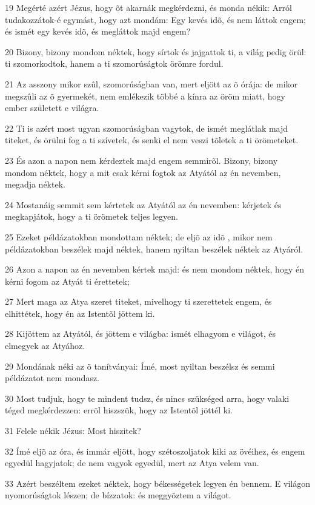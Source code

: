\par 19 Megérté azért Jézus, hogy õt akarnák megkérdezni, és monda nékik: Arról tudakozzátok-é egymást, hogy azt mondám: Egy kevés idõ, és nem láttok engem; és ismét egy kevés idõ, és megláttok majd engem?
\par 20 Bizony, bizony mondom néktek, hogy sírtok és jajgattok ti, a világ pedig örül: ti szomorkodtok, hanem a ti szomorúságtok örömre fordul.
\par 21 Az asszony mikor szûl, szomorúságban van, mert eljött az õ órája: de mikor megszûli az õ gyermekét, nem emlékezik többé a kínra az öröm miatt, hogy ember született e világra.
\par 22 Ti is azért most ugyan szomorúságban vagytok, de ismét meglátlak majd titeket, és örülni fog a ti szívetek, és senki el nem veszi tõletek a ti örömeteket.
\par 23 És azon a napon nem kérdeztek majd engem semmirõl. Bizony, bizony mondom néktek, hogy a mit csak kérni fogtok az Atyától az én nevemben, megadja néktek.
\par 24 Mostanáig semmit sem kértetek az Atyától az én nevemben: kérjetek és megkapjátok, hogy a ti örömetek teljes legyen.
\par 25 Ezeket példázatokban mondottam néktek; de eljõ az idõ , mikor nem példázatokban beszélek majd néktek, hanem nyiltan beszélek néktek az Atyáról.
\par 26 Azon a napon az én nevemben kértek majd: és nem mondom néktek, hogy én kérni fogom az Atyát ti érettetek;
\par 27 Mert maga az Atya szeret titeket, mivelhogy ti szerettetek engem, és elhittétek, hogy én az Istentõl jöttem ki.
\par 28 Kijöttem az Atyától, és jöttem e világba: ismét elhagyom e világot, és elmegyek az Atyához.
\par 29 Mondának néki az õ tanítványai: Ímé, most nyiltan beszélsz és semmi példázatot nem mondasz.
\par 30 Most tudjuk, hogy te mindent tudsz, és nincs szükséged arra, hogy valaki téged megkérdezzen: errõl hiszszük, hogy az Istentõl jöttél ki.
\par 31 Felele nékik Jézus: Most hiszitek?
\par 32 Ímé eljõ az óra, és immár eljött, hogy szétoszoljatok kiki az övéihez, és engem egyedül hagyjatok; de nem vagyok egyedül, mert az Atya velem van.
\par 33 Azért beszéltem ezeket néktek, hogy békességetek legyen én bennem. E világon nyomorúságtok lészen; de bízzatok: és meggyõztem a világot.

